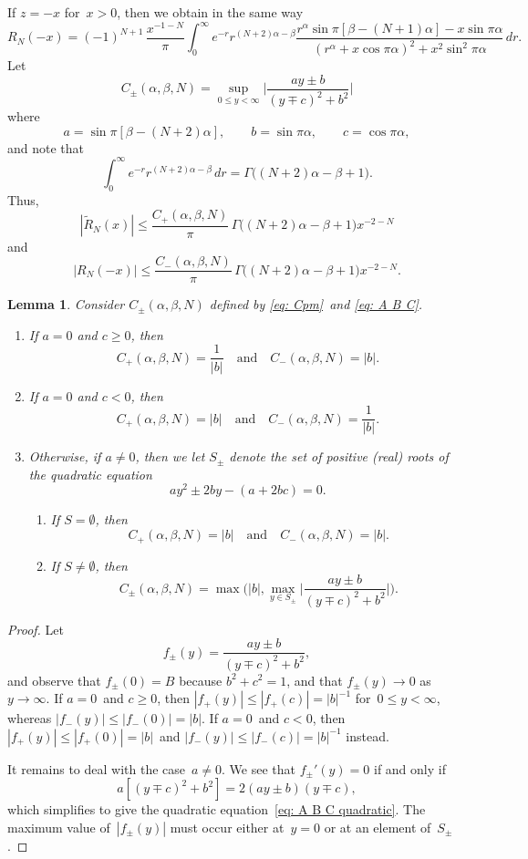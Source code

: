 \documentclass[12pt,a4paper]{article}
\newtheorem{lemma}[theorem]{Lemma}
\begin{document}
If $z=-x$ for~$x>0$, then we obtain in the same way
\[
R_N(-x)=(-1)^{N+1}\,\frac{x^{-1-N}}{\pi}\int_0^\infty 
    e^{-r}r^{(N+2)\alpha-\beta}
    \frac{r^\alpha\sin\pi[\beta-(N+1)\alpha]-x\sin\pi\alpha}%
{(r^\alpha+x\cos\pi\alpha)^2+x^2\sin^2\pi\alpha}\,dr.
\]
Let
\begin{equation}\label{eq: Cpm}
C_\pm(\alpha, \beta, N)=\sup_{0\le y<\infty}
    \biggl|\frac{ay\pm b}{(y\mp c)^2+b^2}\biggr|
\end{equation}
where
\begin{equation}\label{eq: A B C}
a=\sin\pi[\beta-(N+2)\alpha],\qquad b=\sin\pi\alpha,\qquad c=\cos\pi\alpha,
\end{equation}
and note that
\[
\int_0^\infty e^{-r}r^{(N+2)\alpha-\beta}\,dr
    =\Gamma\bigl((N+2)\alpha-\beta+1\bigr).
\]
Thus,
\[
|\tilde R_N(x)|\le\frac{C_+(\alpha,\beta,N)}{\pi}\,
    \Gamma\bigl((N+2)\alpha-\beta+1\bigr)x^{-2-N}
\]
and
\[
|R_N(-x)|\le\frac{C_-(\alpha,\beta,N)}{\pi}\,
    \Gamma\bigl((N+2)\alpha-\beta+1\bigr)x^{-2-N}.
\]

\begin{lemma}
Consider $C_\pm(\alpha,\beta,N)$ defined by \eqref{eq: Cpm}~and 
\eqref{eq: A B C}.
\begin{enumerate}
\item
If $a=0$ and $c\ge0$, then
\[
C_+(\alpha, \beta, N)=\frac{1}{|b|}\quad\text{and}\quad
C_-(\alpha, \beta, N)=|b|.
\]
\item 
If $a=0$ and $c<0$, then
\[
C_+(\alpha, \beta, N)=|b|\quad\text{and}\quad
C_-(\alpha, \beta, N)=\frac{1}{|b|}.
\]
\item
Otherwise, if $a\ne0$, then we let $S_\pm$ denote the set of positive (real) 
roots of the quadratic equation
\begin{equation}\label{eq: A B C quadratic}
ay^2\pm2by-(a+2bc)=0.
\end{equation}
\begin{enumerate}
\item If $S=\emptyset$, then
\[
C_+(\alpha, \beta, N)=|b|\quad\text{and}\quad C_-(\alpha, \beta, N)=|b|.
\]
\item If $S\ne\emptyset$, then
\[
C_\pm(\alpha,\beta,N)=\max\biggl(|b|,
\max_{y\in S_\pm}\biggl|\frac{ay\pm b}{(y\mp c)^2+b^2}\biggr|\biggr).
\]
\end{enumerate}
\end{enumerate}
\end{lemma}
\begin{proof}
Let
\[
f_\pm(y)=\frac{ay\pm b}{(y\mp c)^2+b^2},
\]
and observe that $f_\pm(0)=B$ because $b^2+c^2=1$, and that $f_\pm(y)\to0$ 
as~$y\to\infty$.  If $a=0$~and $c\ge0$, then $|f_+(y)|\le|f_+(c)|=|b|^{-1}$
for~$0\le y<\infty$, whereas $|f_-(y)|\le|f_-(0)|=|b|$.  If $a=0$~and $c<0$,
then $|f_+(y)|\le|f_+(0)|=|b|$~and $|f_-(y)|\le|f_-(c)|=|b|^{-1}$ instead.

It remains to deal with the case~$a\ne0$.  We see that $f_\pm'(y)=0$ if and 
only if
\[
a[(y\mp c)^2+b^2]=2(ay\pm b)(y\mp c),
\]
which simplifies to give the quadratic equation~\eqref{eq: A B C quadratic}.
The maximum value of~$|f_\pm(y)|$ must occur either at~$y=0$ or at an element 
of~$S_\pm$.
\end{proof}


\end{document}
